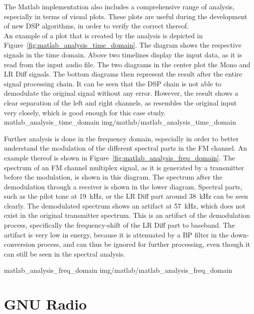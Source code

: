 The Matlab implementation also includes a comprehensive range of analysis, especially in terms of visual plots.
These plots are useful during the development of new DSP algorithms, in order to verify the correct thereof.\\

An example of a plot that is created by the analysis is depicted in Figure~\ref{fig:matlab_analysis_time_domain}.
The diagram shows the respective signals in the time domain.
Above two timelines display the input data, as it is read from the input audio file.
The two diagrams in the center plot the Mono and LR Diff signals.
The bottom diagrams then represent the result after the entire signal processing chain.
It can be seen that the DSP chain is not able to demodulate the original signal without any error.
However, the result shows a clear separation of the left and right channels, as resembles the original input very closely, which is good enough for this case study.\\

 {matlab_analysis_time_domain} {img/matlab/matlab_analysis_time_domain}

Further analysis is done in the frequency domain, especially in order to better understand the modulation of the different spectral parts in the FM channel.
An example thereof is shown in Figure~\ref{fig:matlab_analysis_freq_domain}.
The spectrum of an FM channel multiplex signal, as it is generated by a transmitter before the modulation, is shown in this diagram.
The spectrum after the demodulation through a receiver is shown in the lower diagram.
Spectral parts, such as the pilot tone at 19~kHz, or the LR Diff part around 38~kHz can be seen clearly.
The demodulated spectrum shows an artifact at 57~kHz, which does not exist in the original transmitter spectrum.
This is an artifact of the demodulation process, specifically the frequency-shift of the LR Diff part to baseband.
The artifact is very low in energy, because it is attenuated by a BP filter in the down-conversion process, and can thus be ignored for further processing, even though it can still be seen in the spectral analysis.

 {matlab_analysis_freq_domain} {img/matlab/matlab_analysis_freq_domain}

\section{GNU Radio}

